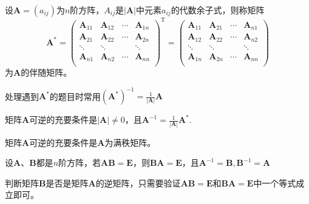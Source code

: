 \begin{definition}[方阵的伴随矩阵]
    设$\boldsymbol{A}=(a_{ij})$为$n$阶方阵，$A_{ij}$是$|\boldsymbol{A}|$中元素$a_{ij}$的代数余子式，则称矩阵
    $$\boldsymbol{A}^{\ast }=\left(\begin{array}{cccc}
        \boldsymbol{A}_{11} &  \boldsymbol{A}_{12} & \cdots & \boldsymbol{A}_{1n}\\
        \boldsymbol{A}_{21} &  \boldsymbol{A}_{22} & \cdots & \boldsymbol{A}_{2n}\\
        \ddots &  \ddots &  & \ddots\\
        \boldsymbol{A}_{n1} &  \boldsymbol{A}_{n2} & \cdots & \boldsymbol{A}_{nn}\\
    \end{array}\right)^\mathrm{T}=\left(\begin{array}{cccc}
        \boldsymbol{A}_{11} &  \boldsymbol{A}_{21} & \cdots & \boldsymbol{A}_{n1}\\
        \boldsymbol{A}_{12} &  \boldsymbol{A}_{22} & \cdots & \boldsymbol{A}_{n2}\\
        \ddots &  \ddots &  & \ddots\\
        \boldsymbol{A}_{1n} &  \boldsymbol{A}_{2n} & \cdots & \boldsymbol{A}_{nn}\\
    \end{array}\right)$$
    为$\boldsymbol{A}$的{\heiti 伴随矩阵}。
\end{definition}
\begin{remark}
    处理遇到$\boldsymbol{A}^\ast$的题目时常用${(\boldsymbol{A}^\ast)}^{-1}=\frac{1}{|\boldsymbol{A}|}\boldsymbol{A}$
\end{remark}

\begin{theorem}[矩阵可逆的条件]
    矩阵$\boldsymbol{A}$可逆的充要条件是$|\boldsymbol{A}|\neq 0$，且$\boldsymbol{A}^{-1}=\frac{1}{|\boldsymbol{A}|}\boldsymbol{A}^\ast$.
\end{theorem}

\begin{theorem}
    矩阵$\boldsymbol{A}$可逆的充要条件是$\boldsymbol{A}$为满秩矩阵。
\end{theorem}

\begin{theorem}
    设$\boldsymbol{A}$、$\boldsymbol{B}$都是$n$阶方阵，若$\boldsymbol{A}\boldsymbol{B}=\boldsymbol{E}$，则$\boldsymbol{B}\boldsymbol{A}=\boldsymbol{E}$，且$\boldsymbol{A}^{-1}=\boldsymbol{B},\boldsymbol{B}^{-1}=\boldsymbol{A}$
\end{theorem}
\begin{remark}
    判断矩阵$\boldsymbol{B}$是否是矩阵$\boldsymbol{A}$的逆矩阵，只需要验证$\boldsymbol{A}\boldsymbol{B}=\boldsymbol{E}$和$\boldsymbol{B}\boldsymbol{A}=\boldsymbol{E}$中一个等式成立即可。
\end{remark}

